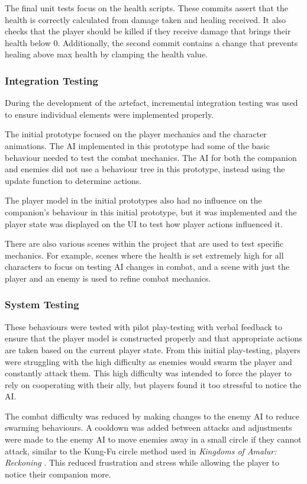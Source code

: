 \documentclass{IEEEtran}
\begin{document}
The final unit tests focus on the health scripts. These commits assert that the health is correctly calculated from damage taken and healing received. It also checks that the player should be killed if they receive damage that brings their health below 0. Additionally, the second commit contains a change that prevents healing above max health by clamping the health value.

\subsubsection{Integration Testing}

During the development of the artefact, incremental integration testing was used to ensure individual elements were implemented properly.

The initial prototype focused on the player mechanics and the character animations. The AI implemented in this prototype had some of the basic behaviour needed to test the combat mechanics. The AI for both the companion and enemies did not use a behaviour tree in this prototype, instead using the update function to determine actions.

The player model in the initial prototypes also had no influence on the companion's behaviour in this initial prototype, but it was implemented and the player state was displayed on the UI to test how player actions influenced it.

There are also various scenes within the project that are used to test specific mechanics. For example, scenes where the health is set extremely high for all characters to focus on testing AI changes in combat, and a scene with just the player and an enemy is used to refine combat mechanics.

\subsubsection{System Testing}

These behaviours were tested with pilot play-testing with verbal feedback to ensure that the player model is constructed properly and that appropriate actions are taken based on the current player state. From this initial play-testing, players were struggling with the high difficulty as enemies would swarm the player and constantly attack them. This high difficulty was intended to force the player to rely on cooperating with their ally, but players found it too stressful to notice the AI.

The combat difficulty was reduced by making changes to the enemy AI to reduce swarming behaviours. A cooldown was added between attacks and adjustments were made to the enemy AI to move enemies away in a small circle if they cannot attack, similar to the Kung-Fu circle method used in \textit{Kingdoms of Amalur: Reckoning} \cite{GAIPKungFuCircle}. This reduced frustration and stress while allowing the player to notice their companion more.
\end{document}
